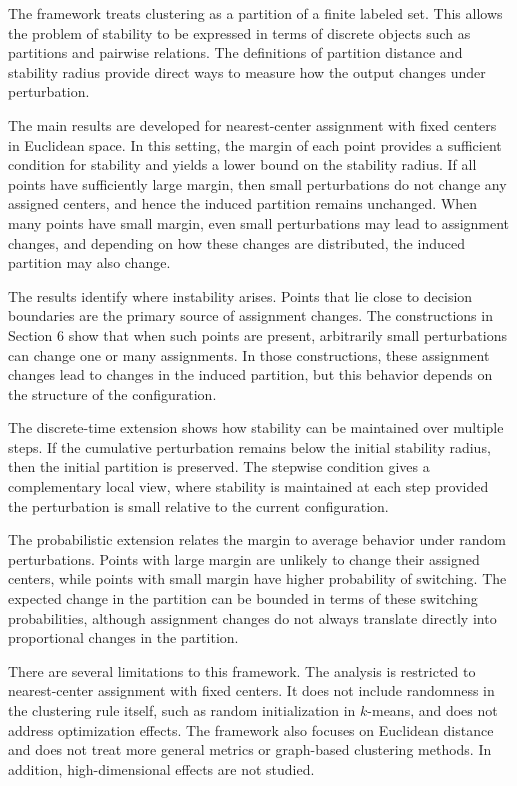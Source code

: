\documentclass[11pt]{amsart}
\theoremstyle{plain}
\theoremstyle{definition}
\begin{document}
The framework treats clustering as a partition of a finite labeled set. This allows the problem of stability to be expressed in terms of discrete objects such as partitions and pairwise relations. The definitions of partition distance and stability radius provide direct ways to measure how the output changes under perturbation.

The main results are developed for nearest-center assignment with fixed centers in Euclidean space. In this setting, the margin of each point provides a sufficient condition for stability and yields a lower bound on the stability radius. If all points have sufficiently large margin, then small perturbations do not change any assigned centers, and hence the induced partition remains unchanged. When many points have small margin, even small perturbations may lead to assignment changes, and depending on how these changes are distributed, the induced partition may also change.

The results identify where instability arises. Points that lie close to decision boundaries are the primary source of assignment changes. The constructions in Section 6 show that when such points are present, arbitrarily small perturbations can change one or many assignments. In those constructions, these assignment changes lead to changes in the induced partition, but this behavior depends on the structure of the configuration.

The discrete-time extension shows how stability can be maintained over multiple steps. If the cumulative perturbation remains below the initial stability radius, then the initial partition is preserved. The stepwise condition gives a complementary local view, where stability is maintained at each step provided the perturbation is small relative to the current configuration.

The probabilistic extension relates the margin to average behavior under random perturbations. Points with large margin are unlikely to change their assigned centers, while points with small margin have higher probability of switching. The expected change in the partition can be bounded in terms of these switching probabilities, although assignment changes do not always translate directly into proportional changes in the partition.

There are several limitations to this framework. The analysis is restricted to nearest-center assignment with fixed centers. It does not include randomness in the clustering rule itself, such as random initialization in $k$-means, and does not address optimization effects. The framework also focuses on Euclidean distance and does not treat more general metrics or graph-based clustering methods. In addition, high-dimensional effects are not studied.
\end{document}
